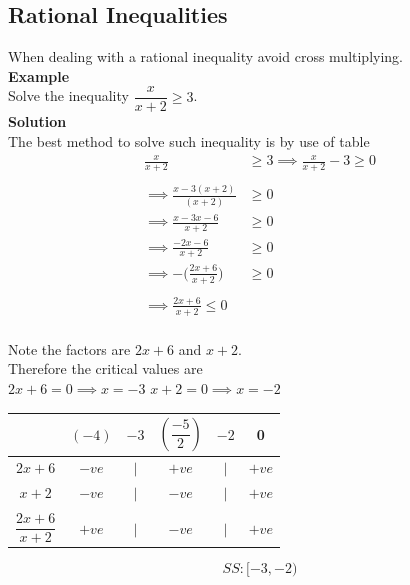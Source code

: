 \documentclass[11pt,a4paper]{article}
\begin{document}
\subsection{Rational Inequalities}
When dealing with a rational inequality avoid cross multiplying.\\

\textbf{Example}\\
Solve the inequality $\dfrac{x}{x+2}\geq 3$.\\

\textbf{Solution}\\
The best method to solve such inequality is by use of table 
\begin{align*}
\frac{x}{x+2} &\geq 3\implies \frac{x}{x+2}-3\geq 0\\\\
\implies \frac{x-3(x+2)}{(x+2)} & \geq 0\\
\implies \frac{x-3x-6}{x+2} &\geq 0\\
\implies \frac{-2x-6}{x+2} &\geq 0\\
\implies -\bigg(\frac{2x+6}{x+2}\bigg) & \geq 0\\\\
\implies \frac{2x+6}{x+2}\leq 0\\
\end{align*}

Note the factors are $2x+6$ and $x+2$.\\
Therefore the critical values are\\
$2x+6=0\implies x=-3$
$x+2=0\implies x=-2$



\begin{table}[H]
\centering
\begin{tabular}{cccccc}
& $(-4)$ & $-3$ & $(\dfrac{-5}{2})$ & $-2$ & 0\\
\hline
\multicolumn{1}{c|}{$2x+6$}  & $-ve$ & $|$ & $+ve$ & $|$ & $+ve$\\
\multicolumn{1}{c|}{$x+2$} & $-ve$ & $|$ & $-ve$ & $|$ & $+ve$\\
\multicolumn{1}{c|}{}&&&&&\\
\multicolumn{1}{c|}{$\dfrac{2x+6}{x+2}$}  & $+ve$ & $|$ & $-ve$ & $|$ & $+ve$\\
\end{tabular}
\end{table}
$$SS:[-3,-2)$$
\end{document}
